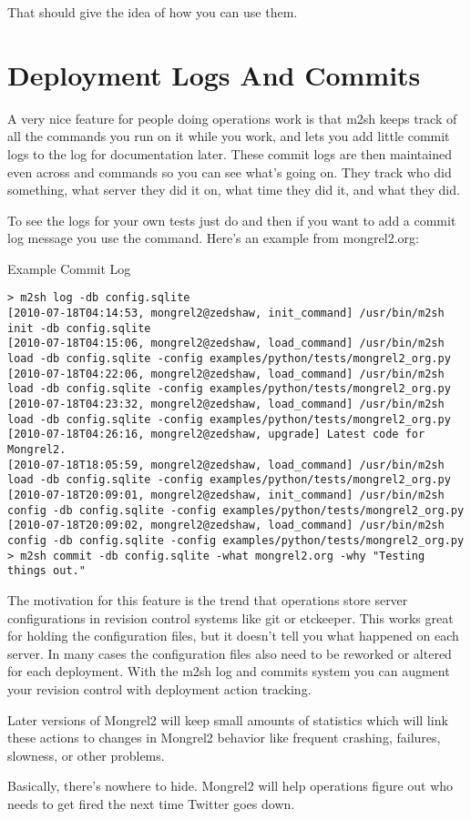 That should give the idea of how you can use them.


\section{Deployment Logs And Commits}

A very nice feature for people doing operations work is that m2sh keeps track of all the
commands you run on it while you work, and lets you add little commit logs to the 
log for documentation later.  These commit logs are then maintained even across 
 and  commands so you can see what's going on.  They 
track who did something, what server they did it on, what time they did it, and what they
did.

To see the logs for your own tests just do  and then
if you want to add a commit log message you use the  command.
Here's an example from mongrel2.org:

\begin{code}{Example Commit Log}
\begin{verbatim}
> m2sh log -db config.sqlite 
[2010-07-18T04:14:53, mongrel2@zedshaw, init_command] /usr/bin/m2sh init -db config.sqlite
[2010-07-18T04:15:06, mongrel2@zedshaw, load_command] /usr/bin/m2sh load -db config.sqlite -config examples/python/tests/mongrel2_org.py
[2010-07-18T04:22:06, mongrel2@zedshaw, load_command] /usr/bin/m2sh load -db config.sqlite -config examples/python/tests/mongrel2_org.py
[2010-07-18T04:23:32, mongrel2@zedshaw, load_command] /usr/bin/m2sh load -db config.sqlite -config examples/python/tests/mongrel2_org.py
[2010-07-18T04:26:16, mongrel2@zedshaw, upgrade] Latest code for Mongrel2.
[2010-07-18T18:05:59, mongrel2@zedshaw, load_command] /usr/bin/m2sh load -db config.sqlite -config examples/python/tests/mongrel2_org.py
[2010-07-18T20:09:01, mongrel2@zedshaw, init_command] /usr/bin/m2sh config -db config.sqlite -config examples/python/tests/mongrel2_org.py
[2010-07-18T20:09:02, mongrel2@zedshaw, load_command] /usr/bin/m2sh config -db config.sqlite -config examples/python/tests/mongrel2_org.py
> m2sh commit -db config.sqlite -what mongrel2.org -why "Testing things out."
\end{verbatim}
\end{code}

The motivation for this feature is the trend that operations store server configurations
in revision control systems like git or etckeeper.  This works great for holding the configuration
files, but it doesn't tell you what happened on each server.  In many cases the configuration
files also need to be reworked or altered for each deployment.  With the m2sh log and commits
system you can augment your revision control with deployment action tracking.

Later versions of Mongrel2 will keep small amounts of statistics which will link these actions
to changes in Mongrel2 behavior like frequent crashing, failures, slowness, or other problems.

Basically, there's nowhere to hide.  Mongrel2 will help operations figure out who needs to
get fired the next time Twitter goes down.

